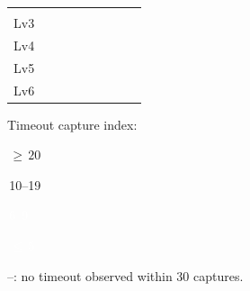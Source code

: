 \begin{table}[t]
{\begin{tabular}{@{}HPP|PP||PP|PP@{}}
  &  \\
 Lv3 &
  &  &
  &  &
  &  &
  &  \\
 \midrule
 Lv4 &
  &  &
  &  &
  &  &
  &  \\
 Lv5 &
  &  &
  &  &
  &  &
  &  \\
 Lv6 &
  &  &
  &  &
  &  &
  &  \\
 \bottomrule
 \end{tabular}%
 }
 \par\vspace{3pt}
 {\scriptsize\begin{minipage}{0.933\columnwidth}
 \raggedright\setlength{\fboxsep}{1.8pt}%
 Timeout capture index:~%
 \colorbox{tmoS1}{\strut\,${\geq}\,20$\,}\colorbox{tmoS2}{\strut\,10--19\,}\colorbox{tmoS3}{\strut\,\textcolor{white}{6--9}\,}\colorbox{tmoS4}{\strut\,\textcolor{white}{${\leq}\,5$}\,}\par
 --: no timeout observed within 30 captures.\par
 \end{minipage}}
\end{table}
